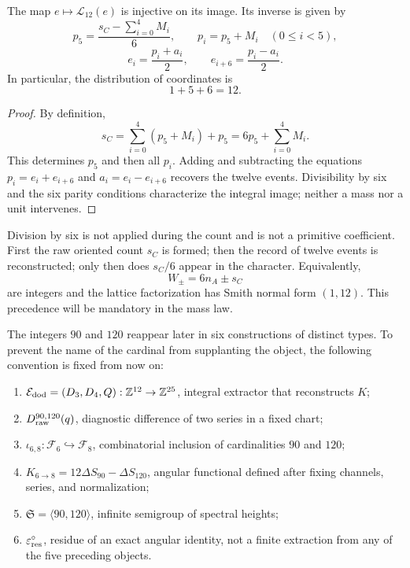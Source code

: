 \begin{theorem}
\label{thm:memoria-1-5-6}
The map \(e\mapsto\mathscr L_{12}(e)\) is injective on its image. Its
inverse is given by
\[
 p_5=\frac{s_C-\sum_{i=0}^{4}M_i}{6},\qquad
 p_i=p_5+M_i\quad(0\le i<5),
\]
\[
 e_i=\frac{p_i+a_i}{2},\qquad
 e_{i+6}=\frac{p_i-a_i}{2}.
\]
In particular, the distribution of coordinates is
\[
 \boxed{1+5+6=12}.
\]
\end{theorem}

\begin{proof}
By definition,
\[
 s_C=\sum_{i=0}^{4}(p_5+M_i)+p_5
 =6p_5+\sum_{i=0}^{4}M_i.
\]
This determines \(p_5\) and then all \(p_i\). Adding and subtracting the
equations \(p_i=e_i+e_{i+6}\) and \(a_i=e_i-e_{i+6}\) recovers the twelve
events. Divisibility by six and the six parity conditions
characterize the integral image; neither a mass nor a unit intervenes.
\end{proof}

Division by six is not applied during the count and is not a primitive
coefficient. First the raw oriented count \(s_C\) is formed; then the
record of twelve events is reconstructed; only then does
\(s_C/6\) appear in the character. Equivalently,
\[
 W_\pm=6n_A\pm s_C
\]
are integers and the lattice factorization has Smith normal form
\((1,12)\). This precedence will be mandatory in the mass law.

The integers \(90\) and \(120\) reappear later in six constructions
of distinct types. To prevent the name of the cardinal from supplanting the
object, the following convention is fixed from now on:

\begin{enumerate}
 \item \(\mathcal E_{\rm dod}=(D_3,D_4,Q):\mathbb Z^{12}\to\mathbb Z^{25}\),
       integral extractor that reconstructs \(K\);
 \item \(D_{\rm raw}^{90,120}(q)\), diagnostic difference of two series in
       a fixed chart;
 \item \(\iota_{6,8}:\mathcal F_6\hookrightarrow\mathcal F_8\), combinatorial
       inclusion of cardinalities \(90\) and \(120\);
 \item \(K_{6\to8}=12\Delta S_{90}-\Delta S_{120}\), angular functional
       defined after fixing channels, series, and normalization;
 \item \(\mathfrak S=\langle90,120\rangle\), infinite semigroup of spectral
       heights;
 \item \(\varepsilon_{\rm res}^{\circ}\), residue of an exact angular identity,
       not a finite extraction from any of the five preceding objects.
\end{enumerate}

